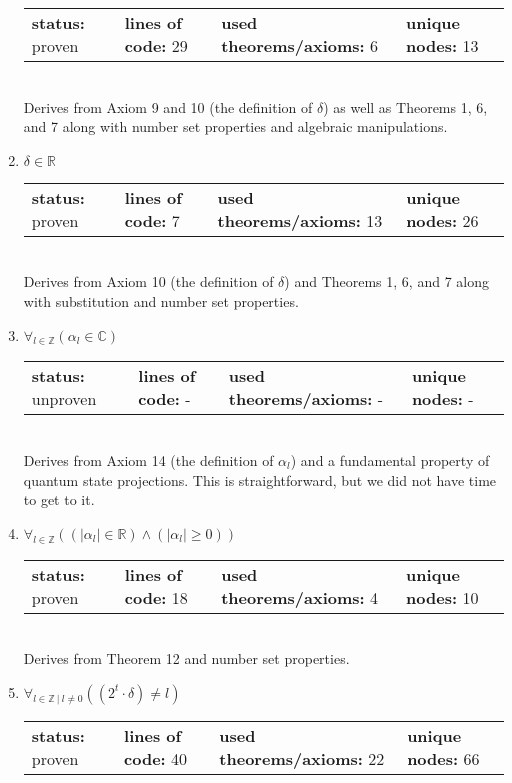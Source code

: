 \documentclass{article}[12pt]
\begin{document}
\begin{enumerate}
\begin{tabular}{l | l | l | l}
    \textbf{status:} proven & \textbf{lines of code:} 29 & \textbf{used theorems/axioms:} 6 & \textbf{unique nodes:} 13
  \end{tabular} \hfill \\
Derives from Axiom 9 and 10 (the definition of $\delta$) as well as Theorems 1, 6, and 7 along with number set properties and algebraic manipulations.
\item $\delta \in \mathbb{R}$ \hfill \\
  \begin{tabular}{l | l | l | l}
    \textbf{status:} proven & \textbf{lines of code:} 7 & \textbf{used theorems/axioms:} 13 & \textbf{unique nodes:} 26
  \end{tabular} \hfill \\
Derives from Axiom 10 (the definition of $\delta$) and Theorems 1, 6, and 7 along with substitution and number set properties.
\item $\forall_{l \in \mathbb{Z}} \left(\alpha_{l} \in \mathbb{C}\right)$ \hfill \\
  \begin{tabular}{l | l | l | l}
    \textbf{status:} unproven & \textbf{lines of code:} - & \textbf{used theorems/axioms:} - & \textbf{unique nodes:} -
  \end{tabular} \hfill \\
Derives from Axiom 14 (the definition of $\alpha_l$) and a fundamental property of quantum state projections.  This is straightforward, but we did not have time to get to it.
\item $\forall_{l \in \mathbb{Z}} \left(\left(\left|\alpha_{l}\right| \in \mathbb{R}\right) \land \left(\left|\alpha_{l}\right| \geq 0\right)\right)$ \hfill \\
  \begin{tabular}{l | l | l | l}
    \textbf{status:} proven & \textbf{lines of code:} 18 & \textbf{used theorems/axioms:} 4 & \textbf{unique nodes:} 10
  \end{tabular} \hfill \\
Derives from Theorem 12 and number set properties.
\item $\forall_{l \in \mathbb{Z}~|~l \neq 0} \left(\left(2^{t} \cdot \delta\right) \neq l\right)$ \hfill \\
  \begin{tabular}{l | l | l | l}
    \textbf{status:} proven & \textbf{lines of code:} 40 & \textbf{used theorems/axioms:} 22 & \textbf{unique nodes:} 66
  \end{tabular} \hfill \\

\end{enumerate}
\end{document}
